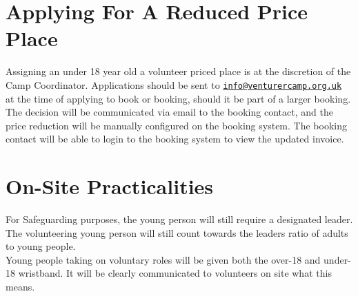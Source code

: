 \documentclass[a4paper, 11pt]{article}
\begin{document}
    \section{Applying For A Reduced Price Place}
    Assigning an under 18 year old a volunteer priced place is at the discretion of the Camp Coordinator. Applications should be sent to \href{mailto:info@venturercamp.org.uk}{\texttt{info@venturercamp.org.uk}} at the time of applying to book or booking, should it be part of a larger booking.\\

    The decision will be communicated via email to the booking contact, and the price reduction will be manually configured on the booking system. The booking contact will be able to login to the booking system to view the updated invoice. 

    \section{On-Site Practicalities}
    For Safeguarding purposes, the young person will still require a designated leader. The volunteering young person will still count towards the leaders ratio of adults to young people.\\

    Young people taking on voluntary roles will be given both the over-18 and under-18 wristband. It will be clearly communicated to volunteers on site what this means. 

    \backPage
\end{document}
